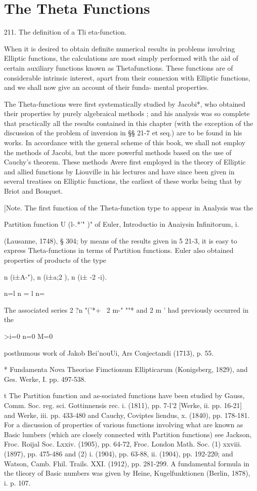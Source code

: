 \chapter{The Theta Functions} 

211. The definition of a Tli eta-function.

When it is desired to obtain definite numerical results in problems
involving Elliptic functions, the calculations are most simply
performed with the aid of certain auxiliary functions known as
Thetafunctions. These functions are of considerable intrinsic
interest, apart from their connexion with Elliptic functions, and we
shall now give an account of their funda- mental properties.

The Theta-functions were first systematically studied by Jacobi*, who
obtained their properties by purely algebraical methods ; and his
analysis was so complete that practically all the results contained in
this chapter (with the exception of the discussion of the problem of
inversion in §§ 21-7 et seq.) are to be found in his works. In
accordance with the general scheme of this book, we shall not employ
the methods of Jacobi, but the more powerful methods based on the use
of Cauchy's theorem. These methods Avere first employed in the theory
of Elliptic and allied functions by Liouville in his lectures and have
since been given in several treatises on Elliptic functions, the
earliest of these works being that by Briot and Bouquet.

[Note. The first function of the Theta-function type to appear in
Analysis was the

Partition function U (l-.*'" )" of Euler, Introductio in Anaiysin
Infinitorum, i.

(Lausanne, 1748), § 304; by means of the results given in 5 21-3, it
is easy to express Theta-functions in terms of Partition functions.
Euler also obtained properties of products of the type

n (i±A-"), n (i±a;2 ), n (i± -2 -i).

n=l n = l n=\

The associated series 2 ?n "('*+ \ 2 m-" ""* and 2 m ' had previously
occurred in the

>i=0 n=0 M=0

posthumous work of Jakob Bei'nouUi, Ars Conjectandi (1713), p. 55.

* Fundamenta Nova Theoriae Fimctionum Ellipticarum (Konigsberg, 1829),
and Ges. Werke, I. pp. 497-538.

t The Partition function and as-sociated functions have been studied
by Gauss, Comm. Soc. reg. sci. Gottinnensis rec. i. (1811), pp. 7-l'2
[Werke, ii. pp. 16-21] and Werke, iii. pp. 433-480 and Cauchy,
Coviptes liendus, x. (1840), pp. 178-181. For a discussion of
properties of various functions involving what are known as Basic
lumbers (which are closely connected with Partition functions) see
Jackson, Froc. Roijal Soc. Lxxiv. (1905), pp. 64-72, Froc. London
Math. Soc. (1) xxviii. (1897), pp. 475-486 and (2) i. (1904), pp.
63-88, ii. (1904), pp. 192-220; and Watson, Camb. Fhil. Trails. XXI.
(1912), pp. 281-299. A fundamental formula in the tlieory of Basic
numbers was given by Heine, Kugelfunktionen (Berlin, 1878), i. p. 107.



